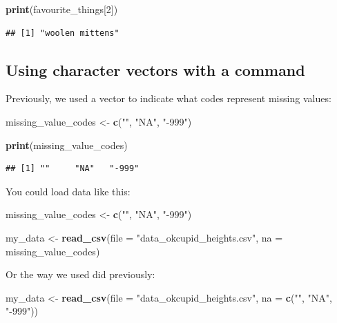 \documentclass[
]{krantz}
\makeatletter
\newenvironment{Shaded}{\begin{snugshade}}{\end{snugshade}}
\newcommand{\DataTypeTok}[1]{\textcolor[rgb]{0.27,0.27,0.27}{#1}}
\newcommand{\DecValTok}[1]{\textcolor[rgb]{0.06,0.06,0.06}{#1}}
\newcommand{\KeywordTok}[1]{\textcolor[rgb]{0.27,0.27,0.27}{\textbf{#1}}}
\newcommand{\NormalTok}[1]{#1}
\newcommand{\StringTok}[1]{\textcolor[rgb]{0.5,0.5,0.5}{#1}}
\newenvironment{kframe}{%
\medskip{}
\setlength{\fboxsep}{.8em}
 \def\at@end@of@kframe{}%
 \ifinner\ifhmode%
  \def\at@end@of@kframe{\end{minipage}}%
  \begin{minipage}{\columnwidth}%
 \fi\fi%
 \def\FrameCommand##1{\hskip\@totalleftmargin \hskip-\fboxsep
 \colorbox{shadecolor}{##1}\hskip-\fboxsep
     \hskip-\linewidth \hskip-\@totalleftmargin \hskip\columnwidth}%
 \MakeFramed {\advance\hsize-\width
   \@totalleftmargin\z@ \linewidth\hsize
   \@setminipage}}%
 {\par\unskip\endMakeFramed%
 \at@end@of@kframe}
\renewenvironment{Shaded}{\begin{kframe}}{\end{kframe}}
\makeatother
\begin{document}
\begin{Shaded}
\begin{Highlighting}[]
\KeywordTok{print}\NormalTok{(favourite_things[}\DecValTok{2}\NormalTok{])}
\end{Highlighting}
\end{Shaded}

\begin{verbatim}
## [1] "woolen mittens"
\end{verbatim}

\hypertarget{using-character-vectors-with-a-command}{%
\subsection{Using character vectors with a command}\label{using-character-vectors-with-a-command}}

Previously, we used a vector to indicate what codes represent missing values:

\begin{Shaded}
\begin{Highlighting}[]
\NormalTok{missing_value_codes <-}\StringTok{ }\KeywordTok{c}\NormalTok{(}\StringTok{""}\NormalTok{, }\StringTok{"NA"}\NormalTok{, }\StringTok{"-999"}\NormalTok{)}

\KeywordTok{print}\NormalTok{(missing_value_codes)}
\end{Highlighting}
\end{Shaded}

\begin{verbatim}
## [1] ""     "NA"   "-999"
\end{verbatim}

You could load data like this:

\begin{Shaded}
\begin{Highlighting}[]
\NormalTok{missing_value_codes <-}\StringTok{ }\KeywordTok{c}\NormalTok{(}\StringTok{""}\NormalTok{, }\StringTok{"NA"}\NormalTok{, }\StringTok{"-999"}\NormalTok{)}

\NormalTok{my_data <-}\StringTok{ }\KeywordTok{read_csv}\NormalTok{(}\DataTypeTok{file =} \StringTok{"data_okcupid_heights.csv"}\NormalTok{, }
                    \DataTypeTok{na =}\NormalTok{ missing_value_codes)}
\end{Highlighting}
\end{Shaded}

Or the way we used did previously:

\begin{Shaded}
\begin{Highlighting}[]
\NormalTok{my_data <-}\StringTok{ }\KeywordTok{read_csv}\NormalTok{(}\DataTypeTok{file =} \StringTok{"data_okcupid_heights.csv"}\NormalTok{, }
                    \DataTypeTok{na =} \KeywordTok{c}\NormalTok{(}\StringTok{""}\NormalTok{, }\StringTok{"NA"}\NormalTok{, }\StringTok{"-999"}\NormalTok{))}
\end{Highlighting}
\end{Shaded}
\end{document}
